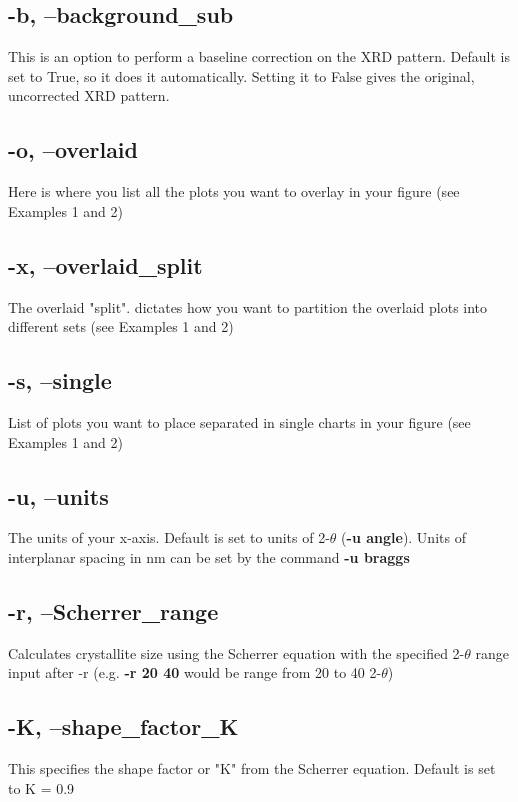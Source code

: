 \documentclass{article}
\begin{document}
\subsection{-b, --background\_sub} 
This is an option to perform a baseline correction on the XRD pattern. Default is set to True, so it does it automatically. Setting it to False gives the original, uncorrected XRD pattern. 

\subsection{-o, --overlaid} 
Here is where you list all the plots you want to overlay in your figure (see Examples 1 and 2)


\subsection{-x, --overlaid\_split} 
The overlaid "split". dictates how you want to partition the overlaid plots into different sets (see Examples 1 and 2)

\subsection{-s, --single} 
List of plots you want to place separated in single charts in your figure (see Examples 1 and 2)

\subsection{-u, --units} 
The units of your x-axis. Default is set to units of 2-$\theta$ (\textbf{-u angle}). Units of interplanar spacing in nm can be set by the command \textbf{-u braggs}

\subsection{-r, --Scherrer\_range} 
Calculates crystallite size using the Scherrer equation with the specified 2-$\theta$ range input after -r (e.g. \textbf{-r 20 40} would be range from 20 to 40 2-$\theta$)

\subsection{-K, --shape\_factor\_K} 
This specifies the shape factor or "K" from the Scherrer equation. Default is set to K = 0.9

\pagebreak
\end{document}
